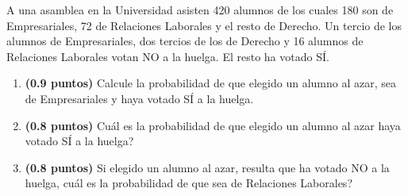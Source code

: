 
A una asamblea en la Universidad asisten 420 alumnos de los cuales 180 son de Empresariales, 72 de Relaciones Laborales y el resto de Derecho. Un tercio de los alumnos de Empresariales, dos tercios de los de Derecho y 16 alumnos de Relaciones Laborales votan NO a la huelga. El resto ha votado SÍ.
\begin{enumerate}[label=\alph*)]
\item \textbf{(0.9 puntos)} Calcule la probabilidad de que elegido un alumno al azar, sea de Empresariales y haya votado SÍ a la huelga.
\item \textbf{(0.8 puntos)} \textquestiondown{}Cuál es la probabilidad de que elegido un alumno al azar haya votado SÍ a la huelga?
\item \textbf{(0.8 puntos)} Si elegido un alumno al azar, resulta que ha votado NO a la huelga, \textquestiondown{}cuál es la probabilidad de que sea de Relaciones Laborales?
\end{enumerate}

